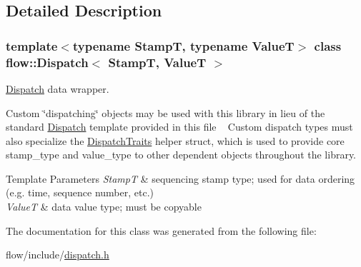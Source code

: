 \subsection{Detailed Description}
\subsubsection*{template$<$typename StampT, typename ValueT$>$\newline
class flow\+::\+Dispatch$<$ Stamp\+T, Value\+T $>$}

\hyperlink{classflow_1_1_dispatch}{Dispatch} data wrapper. 

Custom \char`\"{}dispatching\char`\"{} objects may be used with this library in lieu of the standard {\ttfamily \hyperlink{classflow_1_1_dispatch}{Dispatch}} template provided in this file ~\newline
 Custom dispatch types must also specialize the {\ttfamily \hyperlink{structflow_1_1_dispatch_traits}{Dispatch\+Traits}} helper struct, which is used to provide core {\ttfamily stamp\+\_\+type} and {\ttfamily value\+\_\+type} to other dependent objects throughout the library.


\begin{DoxyTemplParams}{Template Parameters}
{\em StampT} & sequencing stamp type; used for data ordering (e.\+g. time, sequence number, etc.) \\
\hline
{\em ValueT} & data value type; must be copyable \\
\hline
\end{DoxyTemplParams}


The documentation for this class was generated from the following file\+:\begin{DoxyCompactItemize}
\item 
flow/include/\hyperlink{dispatch_8h}{dispatch.\+h}\end{DoxyCompactItemize}
